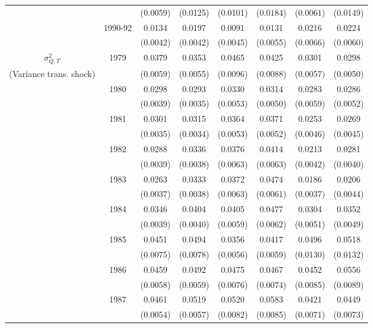 \begin{table}
\begin{center}
{\begin{tabular}{cccc|cc|cc}
\\  &                    & (0.0059) & (0.0125)  & (0.0101) & (0.0184)  & (0.0061) & (0.0149) 
\\  & 1990-92 & 0.0134 &   0.0197 & 0.0091 &   0.0131 & 0.0216 &   0.0224 
\\  &         & (0.0042) & (0.0042) & (0.0045) & (0.0055) & (0.0066) & (0.0060) 
\\ \hline  
 $\sigma^2_{Q,T}$ & 1979      & 0.0379 &   0.0353 & 0.0465 &   0.0425 & 0.0301 &   0.0298 
\\ (Variance trans. shock) &     & (0.0059) & (0.0055) & (0.0096) & (0.0088) & (0.0057) & (0.0050) 
\\  & 1980 & 0.0298 &   0.0293 & 0.0330 &   0.0314 & 0.0283 &   0.0286
\\  &                    & (0.0039) & (0.0035)  & (0.0053) & (0.0050)  & (0.0059) & (0.0052) 
\\  & 1981 & 0.0301 &   0.0315 & 0.0364 &   0.0371 & 0.0253 &   0.0269
\\  &                    & (0.0035) & (0.0034)  & (0.0053) & (0.0052)  & (0.0046) & (0.0045) 
\\  & 1982 & 0.0288 &   0.0336 & 0.0376 &   0.0414 & 0.0213 &   0.0281
\\  &                    & (0.0039) & (0.0038)  & (0.0063) & (0.0063)  & (0.0042) & (0.0040) 
\\  & 1983 & 0.0263 &   0.0333 & 0.0372 &   0.0474 & 0.0186 &   0.0206
\\  &                    & (0.0037) & (0.0038)  & (0.0063) & (0.0061)  & (0.0037) & (0.0044) 
\\  & 1984 & 0.0346 &   0.0404 & 0.0405 &   0.0477 & 0.0304 &   0.0352
\\  &                    & (0.0039) & (0.0040)  & (0.0059) & (0.0062)  & (0.0051) & (0.0049) 
\\  & 1985 & 0.0451 &   0.0494 & 0.0356 &   0.0417 & 0.0496 &   0.0518
\\  &                    & (0.0075) & (0.0078)  & (0.0056) & (0.0059)  & (0.0130) & (0.0132) 
\\  & 1986 & 0.0459 &   0.0492 & 0.0475 &   0.0467 & 0.0452 &   0.0556
\\  &                    & (0.0058) & (0.0059)  & (0.0076) & (0.0074)  & (0.0085) & (0.0089) 
\\  & 1987 & 0.0461 &   0.0519 & 0.0520 &   0.0583 & 0.0421 &   0.0449
\\  &                    & (0.0054) & (0.0057)  & (0.0082) & (0.0085)  & (0.0071) & (0.0073) 

\end{tabular}}
\end{center}
\end{table}
